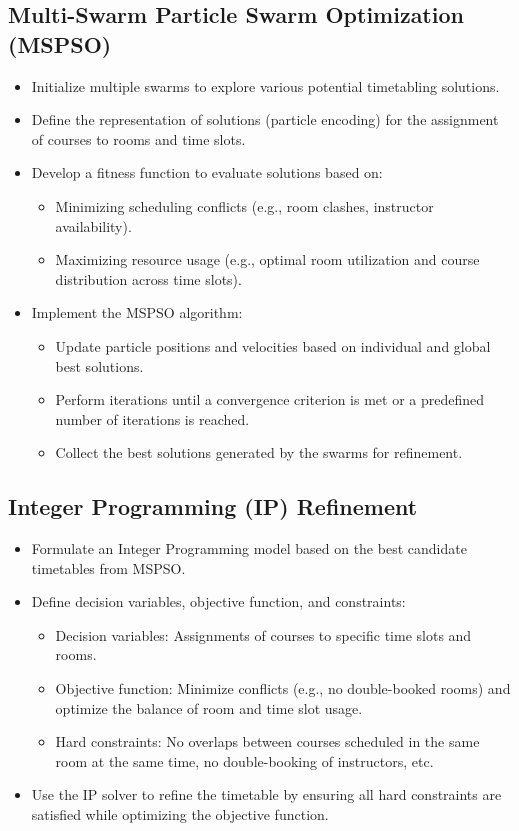 \documentclass{article}
\begin{document}
\subsection{Multi-Swarm Particle Swarm Optimization (MSPSO)}
\label{subsec
} \begin{itemize} \item Initialize multiple swarms to explore various potential timetabling solutions. \item Define the representation of solutions (particle encoding) for the assignment of courses to rooms and time slots. \item Develop a fitness function to evaluate solutions based on: \begin{itemize} \item Minimizing scheduling conflicts (e.g., room clashes, instructor availability). \item Maximizing resource usage (e.g., optimal room utilization and course distribution across time slots). \end{itemize} \item Implement the MSPSO algorithm: \begin{itemize} \item Update particle positions and velocities based on individual and global best solutions. \item Perform iterations until a convergence criterion is met or a predefined number of iterations is reached. \item Collect the best solutions generated by the swarms for refinement. \end{itemize} \end{itemize}

\subsection{Integer Programming (IP) Refinement}
\label{subsec
} \begin{itemize} \item Formulate an Integer Programming model based on the best candidate timetables from MSPSO. \item Define decision variables, objective function, and constraints: \begin{itemize} \item Decision variables: Assignments of courses to specific time slots and rooms. \item Objective function: Minimize conflicts (e.g., no double-booked rooms) and optimize the balance of room and time slot usage. \item Hard constraints: No overlaps between courses scheduled in the same room at the same time, no double-booking of instructors, etc. \end{itemize} \item Use the IP solver to refine the timetable by ensuring all hard constraints are satisfied while optimizing the objective function. \end{itemize}
\end{document}
